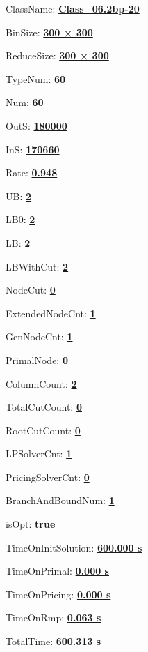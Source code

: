 \documentclass[11pt]{article}
\begin{document}
\pagestyle{empty}


ClassName: \underline{\textbf{Class_06.2bp-20}}
\par
BinSize: \underline{\textbf{300 × 300}}
\par
ReduceSize: \underline{\textbf{300 × 300}}
\par
TypeNum: \underline{\textbf{60}}
\par
Num: \underline{\textbf{60}}
\par
OutS: \underline{\textbf{180000}}
\par
InS: \underline{\textbf{170660}}
\par
Rate: \underline{\textbf{0.948}}
\par
UB: \underline{\textbf{2}}
\par
LB0: \underline{\textbf{2}}
\par
LB: \underline{\textbf{2}}
\par
LBWithCut: \underline{\textbf{2}}
\par
NodeCut: \underline{\textbf{0}}
\par
ExtendedNodeCnt: \underline{\textbf{1}}
\par
GenNodeCnt: \underline{\textbf{1}}
\par
PrimalNode: \underline{\textbf{0}}
\par
ColumnCount: \underline{\textbf{2}}
\par
TotalCutCount: \underline{\textbf{0}}
\par
RootCutCount: \underline{\textbf{0}}
\par
LPSolverCnt: \underline{\textbf{1}}
\par
PricingSolverCnt: \underline{\textbf{0}}
\par
BranchAndBoundNum: \underline{\textbf{1}}
\par
isOpt: \underline{\textbf{true}}
\par
TimeOnInitSolution: \underline{\textbf{600.000 s}}
\par
TimeOnPrimal: \underline{\textbf{0.000 s}}
\par
TimeOnPricing: \underline{\textbf{0.000 s}}
\par
TimeOnRmp: \underline{\textbf{0.063 s}}
\par
TotalTime: \underline{\textbf{600.313 s}}
\par
\newpage
\end{document}
